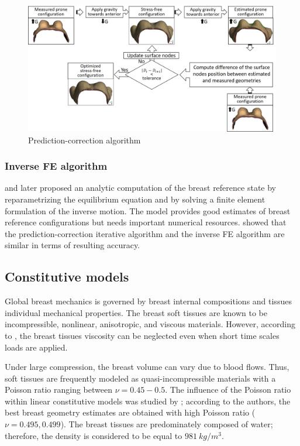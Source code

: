 \begin{figure}[!h]
\centering
\includegraphics[width=1\textwidth,keepaspectratio]{figures/prediction-correction.jpg} 
\caption{Prediction-correction algorithm}\label{predictioncorectionalgo}
\end{figure}


 \subsubsection*{Inverse FE algorithm}
\cite{pathmanathan_predicting_2008} and later \cite{vavourakis_inverse_2016} proposed an analytic computation of the breast reference state by reparametrizing the equilibrium equation and by solving a finite element formulation of the inverse motion. The model provides good estimates of breast reference configurations but needs important numerical resources. \cite{eiben_breast_2014} showed that the prediction-correction iterative algorithm and the inverse FE algorithm are similar in terms of resulting accuracy. 

\subsection{Constitutive models}

Global breast mechanics is governed by breast internal compositions and tissues individual mechanical properties. The breast soft tissues are known to be incompressible, nonlinear, anisotropic, and viscous materials. However, according to \cite{wellman_breast_1999}, the breast tissues viscosity can be neglected even when short time scales loads are applied.  

Under large compression, the breast volume can vary due to blood flows. Thus, soft tissues are frequently modeled as quasi-incompressible materials with a Poisson ratio ranging between $\nu = {0.45-0.5}$. The influence of the Poisson ratio within linear constitutive models was studied by \cite{tanner_factors_2006}; according to the authors, the best breast geometry estimates are obtained with high Poisson ratio ($\nu = {0.495,0.499}$). The breast tissues are predominately composed of water; therefore, the density is considered to be equal to $981\ kg/m^3$.  


